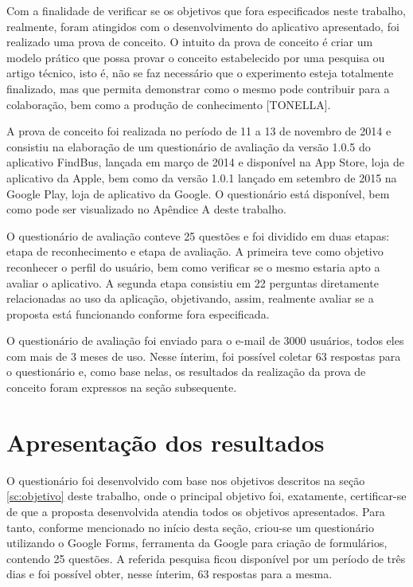 Com a finalidade de verificar se os objetivos que fora especificados neste trabalho, realmente, foram atingidos com o desenvolvimento do aplicativo apresentado, foi realizado uma prova de conceito. O intuito da prova de conceito é criar um modelo prático que possa provar o conceito estabelecido por uma pesquisa ou artigo técnico, isto é, não se faz necessário que o experimento esteja totalmente finalizado, mas que permita demonstrar como o mesmo pode contribuir para a colaboração, bem como a produção de conhecimento [TONELLA].

A prova de conceito foi realizada no período de 11 a 13 de novembro de 2014 e consistiu na elaboração de um questionário de avaliação da versão 1.0.5  do aplicativo FindBus, lançada em março de 2014 e disponível na App Store, loja de aplicativo da Apple, bem como da versão 1.0.1 lançado em setembro de 2015 na Google Play, loja de aplicativo da Google. O questionário está disponível, bem como pode ser visualizado no Apêndice A deste trabalho.

O questionário de avaliação conteve 25 questões e foi dividido em duas etapas: etapa de reconhecimento e etapa de avaliação. A primeira teve como objetivo reconhecer o perfil do usuário, bem como verificar se o mesmo estaria apto a avaliar o aplicativo. A segunda etapa consistiu em 22 perguntas diretamente relacionadas ao uso da aplicação, objetivando, assim, realmente avaliar se a proposta está funcionando conforme fora especificada. 

O questionário de avaliação foi enviado para o e-mail de 3000 usuários, todos eles com mais de 3 meses de uso. Nesse ínterim, foi possível coletar 63 respostas para o questionário e, como base nelas, os resultados da realização da prova de conceito foram expressos na seção subsequente. 

\section{Apresentação dos resultados}
\label{sc:apresentacaoResultados}

O questionário foi desenvolvido com base nos objetivos descritos na seção \ref{sc:objetivo} deste trabalho, onde o principal objetivo foi, exatamente, certificar-se de que a proposta desenvolvida atendia todos os objetivos apresentados. Para tanto, conforme mencionado no início desta seção, criou-se um questionário utilizando o Google Forms, ferramenta da Google para criação de formulários, contendo 25 questões. A referida pesquisa ficou disponível por um período de três dias e foi possível obter, nesse ínterim, 63 respostas para a mesma.  

